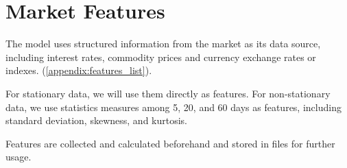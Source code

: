 \section{Market Features}
The model uses structured information from the market as its data source, including interest rates, commodity prices and currency exchange rates or indexes. (\autoref{appendix:features_list}).
\par
For stationary data, we will use them directly as features. For non-stationary data, we use statistics measures among 5, 20, and 60 days as features, including standard deviation, skewness, and kurtosis.
\par
Features are collected and calculated beforehand and stored in files for further usage.